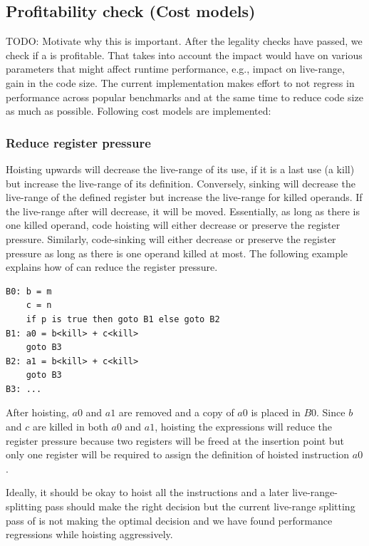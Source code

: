 \documentclass[sigplan,10pt,review,anonymous]{acmart}\settopmatter{printfolios=true,printccs=false,printacmref=false}
\begin{document}
\subsection{Profitability check (Cost models)}
\label{subsec:cost-models}
TODO: Motivate why this is important.
After the legality checks have passed, we check if a \gcm{} is profitable.  That
takes into account the impact \gcm{} would have on various parameters that might
affect runtime performance, e.g., impact on live-range, gain in the code
size. The current implementation makes effort to not regress in performance
across popular benchmarks and at the same time to reduce code size as much as
possible. Following cost models are implemented:

\subsubsection{Reduce register pressure}
\label{hoist:reg-pressure}
Hoisting upwards will decrease the live-range of its use, if it is a last use (a
kill) but increase the live-range of its definition. Conversely, sinking will
decrease the live-range of the defined register but increase the live-range for
killed operands. If the live-range after \GCM{} will decrease, it will be
moved. Essentially, as long as there is one killed operand, code hoisting will
either decrease or preserve the register pressure.  Similarly, code-sinking will
either decrease or preserve the register pressure as long as there is one
operand killed at most.  The following example explains how \GCM{} of can reduce
the register pressure.

\begin{verbatim}
B0: b = m
    c = n
    if p is true then goto B1 else goto B2
B1: a0 = b<kill> + c<kill>
    goto B3
B2: a1 = b<kill> + c<kill>
    goto B3
B3: ...
\end{verbatim}

After hoisting, $a0$ and $a1$ are removed and a copy of $a0$ is placed in
$B0$. Since $b$ and $c$ are killed in both $a0$ and $a1$, hoisting the
expressions will reduce the register pressure because two registers will be
freed at the insertion point but only one register will be required to assign
the definition of hoisted instruction $a0$.

Ideally, it should be okay to hoist all the instructions and a later
live-range-splitting \cite{cooper1998live} pass should make the right decision
but the current live-range splitting pass of \LLVM{} is not making the optimal
decision and we have found performance regressions while hoisting aggressively.
\end{document}
